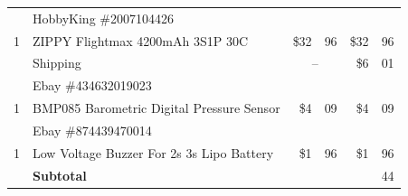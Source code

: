 \documentclass[11pt, a4paper, onecolumn, oneside, parskip=half]{scrartcl}
\begin{document}
\begin{tabular}{llr@{.}lr@{.}l}
  & \multicolumn{3}{l}{HobbyKing \#2007104426} \\ %
1 & ZIPPY Flightmax 4200mAh 3S1P 30C & \$32&96 & \$32&96 \\
  & Shipping & \multicolumn{2}{c}{--} & \$6&01 \\
\hline %

  & \multicolumn{3}{l}{Ebay \#434632019023} \\ %
1 & BMP085 Barometric Digital Pressure Sensor & \$4&09 & \$4&09 \\
\hline %

  & \multicolumn{3}{l}{Ebay \#874439470014} \\ %
1 & Low Voltage Buzzer For 2s 3s Lipo Battery & \$1&96 & \$1&96 \\

\hline
\hline
  & \textbf{Subtotal} & \multicolumn{2}{c}{} & \texteuro 299&44 \\
\end{tabular}
\end{document}
